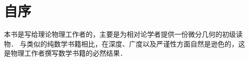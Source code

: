 

%


\section*{自序}


本书是写给理论物理工作者的，主要是为相对论学者提供一份微分几何的{\kaishu 初级}读物．
与类似的纯数学书籍相比，在深度、广度以及严谨性方面自然是逊色的，这是物理工作者撰写数学书籍的必然结果．


%
%
%
%
%


